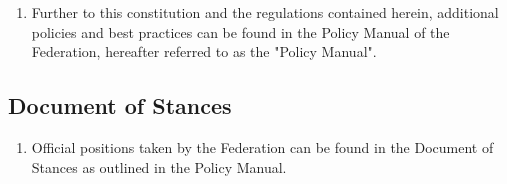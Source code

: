 \begin{enumerate}
 \item Further to this constitution and the regulations contained herein, additional policies and best practices can be found in the Policy Manual of the Federation, hereafter referred to as the "Policy Manual".
\end{enumerate}

\subsection{Document of Stances}
\label{document-of-stances}

\begin{enumerate}
 \item Official positions taken by the Federation can be found in the Document of Stances as outlined in the Policy Manual.
\end{enumerate}
